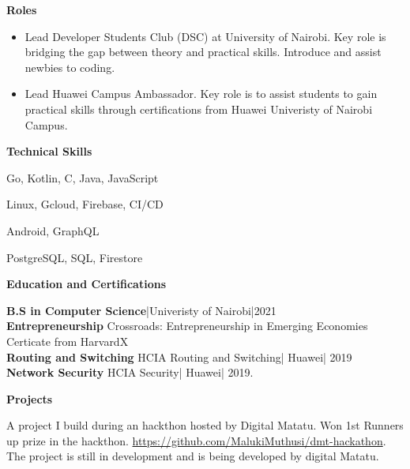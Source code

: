 \documentclass[a4paper]{article}
\begin{document}
\begin{center}
    {\Large \textbf{Roles}}
\end{center}
\begin{itemize}[noitemsep]
    \item Lead Developer Students Club (DSC) at University of Nairobi. Key role is bridging the gap between theory and practical skills. Introduce and assist newbies to coding.
    \item Lead Huawei Campus Ambassador. Key role is to assist students to gain practical skills through certifications from Huawei Univeristy of Nairobi Campus.
\end{itemize}

\begin{center}
    {\Large \textbf{Technical Skills}}
\end{center}
\begin{description}[noitemsep]
    \item[Languages:] Go, Kotlin, C, Java, JavaScript
    \item[Platforms and tools:] Linux, Gcloud, Firebase, CI/CD
    \item[Frameworks:] Android, GraphQL
    \item[Databases:] PostgreSQL, SQL, Firestore
\end{description}

\begin{center}
    {\Large \textbf{Education and Certifications}}
\end{center}
\textbf{B.S in Computer Science}|Univeristy of Nairobi|2021 \\
\textbf{Entrepreneurship} Crossroads: Entrepreneurship in Emerging Economies Certicate from HarvardX \\
\textbf{Routing and Switching} HCIA Routing and Switching| Huawei| 2019 \\
\textbf{Network Security} HCIA Security| Huawei| 2019. \par

\begin{center}
    {\Large \textbf{Projects} }
\end{center}
\begin{description}[noitemsep]
    \item[Digital Matatu Fare:] A project I build during an hackthon hosted by Digital Matatu. Won 1st Runners up prize in the hackthon. \url{ https://github.com/MalukiMuthusi/dmt-hackathon}. The project is still in development and is being developed by digital Matatu.
\end{description}
\end{document}
